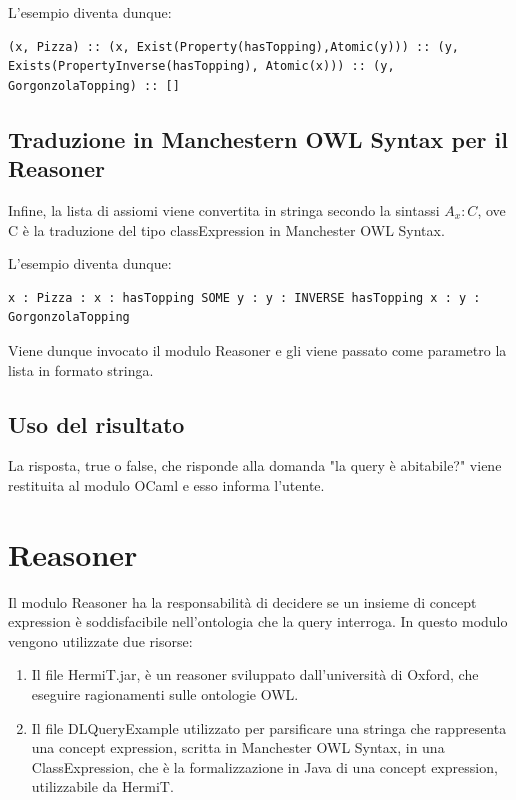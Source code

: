 L'esempio diventa dunque:
\begin{verbatim}
(x, Pizza) :: (x, Exist(Property(hasTopping),Atomic(y))) :: (y, Exists(PropertyInverse(hasTopping), Atomic(x))) :: (y, GorgonzolaTopping) :: []
\end{verbatim}

\subsection{Traduzione in Manchestern OWL Syntax per il Reasoner}
Infine, la lista di assiomi viene convertita in stringa secondo la sintassi \(A_{x} : C\), ove C è la traduzione del tipo classExpression in Manchester OWL Syntax.

L'esempio diventa dunque:
\begin{verbatim}
x : Pizza : x : hasTopping SOME y : y : INVERSE hasTopping x : y : GorgonzolaTopping
\end{verbatim}
Viene dunque invocato il modulo Reasoner e gli viene passato come parametro la lista in formato stringa.

\subsection{Uso del risultato}
La risposta, true o false, che risponde alla domanda "la query è abitabile?" viene restituita al modulo OCaml e esso informa l'utente.

\newpage
\section{Reasoner}
Il modulo Reasoner ha la responsabilità di decidere se un insieme di concept expression è soddisfacibile nell'ontologia che la query interroga. In questo modulo vengono utilizzate due risorse:
\begin{enumerate}
    \item Il file HermiT.jar\cite{HermiT}, è un reasoner sviluppato dall'università di Oxford, che eseguire ragionamenti sulle ontologie OWL.
    \item Il file DLQueryExample\cite{DLQueryExample} utilizzato per parsificare una stringa che rappresenta una concept expression, scritta in Manchester OWL Syntax, in una ClassExpression, che è la formalizzazione in Java di una concept expression, utilizzabile da HermiT.
\end{enumerate}

